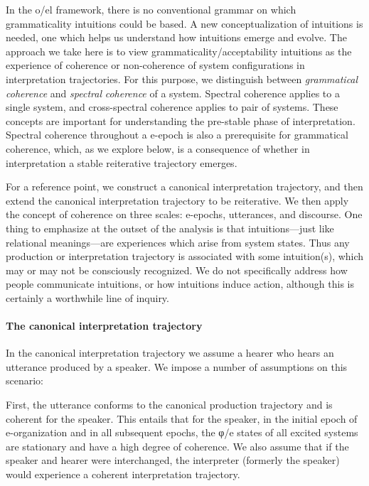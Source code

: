 In the o/el framework, there is no conventional grammar on which grammaticality intuitions could be based. A new conceptualization of intuitions is needed, one which helps us understand how intuitions emerge and evolve. The approach we take here is to view grammaticality/acceptability intuitions as the experience of coherence or non-coherence of system configurations in interpretation trajectories. For this purpose, we distinguish between \textit{grammatical} \textit{coherence} and \textit{spectral} \textit{coherence} of a system. Spectral coherence applies to a single system, and cross-spectral coherence applies to pair of systems. These concepts are important for understanding the pre-stable phase of interpretation. Spectral coherence throughout a e-epoch is also a prerequisite for grammatical coherence, which, as we explore below, is a consequence of whether in interpretation a stable reiterative trajectory emerges.

For a reference point, we construct a canonical interpretation trajectory, and then extend the canonical interpretation trajectory to be reiterative. We then apply the concept of coherence on three scales: e-epochs, utterances, and discourse. One thing to emphasize at the outset of the analysis is that intuitions—just like relational meanings—are experiences which arise from system states. Thus any production or interpretation trajectory is associated with some intuition(s), which may or may not be consciously recognized. We do not specifically address how people communicate intuitions, or how intuitions induce action, although this is certainly a worthwhile line of inquiry.

\paragraph{The canonical interpretation trajectory}

In the canonical interpretation trajectory we assume a hearer who hears an utterance produced by a speaker. We impose a number of assumptions on this scenario:

First, the utterance conforms to the canonical production trajectory and is coherent for the speaker. This entails that for the speaker, in the initial epoch of e-organization and in all subsequent epochs, the φ/e states of all excited systems are stationary and have a high degree of coherence. We also assume that if the speaker and hearer were interchanged, the interpreter (formerly the speaker) would experience a coherent interpretation trajectory. 

